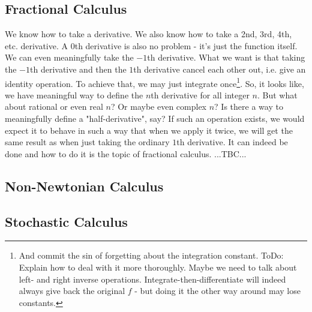 \subsection{Fractional Calculus}
We know how to take a derivative. We also know how to take a 2nd, 3rd, 4th, etc. derivative. A 0th derivative is also no problem - it's just the function itself. We can even meaningfully take the $-1$th derivative. What we want is that taking the $-1$th derivative and then the $1$th derivative cancel each other out, i.e. give an identity operation. To achieve that, we may just integrate once\footnote{And commit the sin of forgetting about the integration constant. ToDo: Explain how to deal with it more thoroughly. Maybe we need to talk about left- and right inverse operations. Integrate-then-differentiate will indeed always give back the original $f$ - but doing it the other way around may lose constants.}. So, it looks like, we have meaningful way to define the $n$th derivative for all integer $n$. But what about rational or even real $n$? Or maybe even complex $n$? Is there a way to meaningfully define a "half-derivative", say? If such an operation exists, we would expect it to behave in such a way that when we apply it twice, we will get the same result as when just taking the ordinary $1$th derivative. It can indeed be done and how to do it is the topic of fractional calculus. ...TBC...


\subsection{Non-Newtonian Calculus}


% 


\subsection{Stochastic Calculus}


